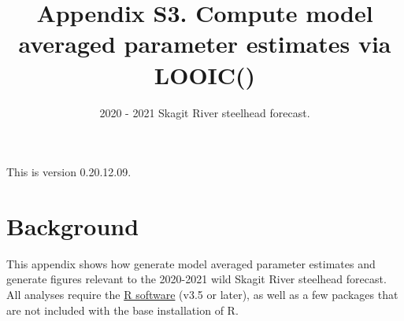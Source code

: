 \documentclass[
  11pt,
]{article}
\title{Appendix S3. Compute model averaged parameter estimates via LOOIC()}
\subtitle{2020 - 2021 Skagit River steelhead forecast.}
\author{}
\date{\vspace{-2.5em}}
\begin{document}
\maketitle

{
\setcounter{tocdepth}{3}
\tableofcontents
}
\vspace{0.2in}

This is version 0.20.12.09.

\hypertarget{background}{%
\section{Background}\label{background}}

This appendix shows how generate model averaged parameter estimates and
generate figures relevant to the 2020-2021 wild Skagit River steelhead
forecast. All analyses require the \href{https://cran.r-project.org/}{R
software} (v3.5 or later), as well as a few packages that are not
included with the base installation of R.
\end{document}

